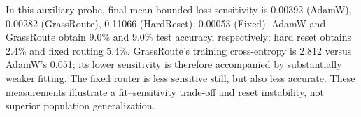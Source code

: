 In this auxiliary probe, final mean bounded-loss sensitivity is 0.00392 (AdamW), 0.00282 (GrassRoute), 0.11066 (HardReset), 0.00053 (Fixed). AdamW and GrassRoute obtain 9.0\% and 9.0\% test accuracy, respectively; hard reset obtains 2.4\% and fixed routing 5.4\%. GrassRoute's training cross-entropy is 2.812 versus AdamW's 0.051; its lower sensitivity is therefore accompanied by substantially weaker fitting. The fixed router is less sensitive still, but also less accurate. These measurements illustrate a fit--sensitivity trade-off and reset instability, not superior population generalization.
